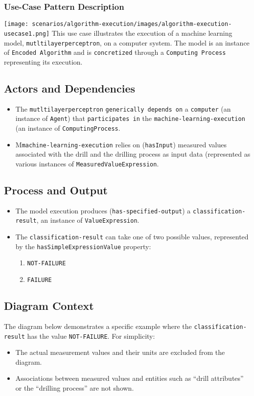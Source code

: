 \subsubsection*{Use-Case Pattern Description}

\texttt{[image: scenarios/algorithm-execution/images/algorithm-execution-usecase1.png]}
This use case illustrates the execution of a machine learning model, \texttt{mutltilayerperceptron}, on a computer system. The model is an instance of \texttt{Encoded Algorithm} and is \texttt{concretized} through a \texttt{Computing Process} representing its execution.

\subsection*{Actors and Dependencies}  
\begin{itemize}
    \item The \texttt{mutltilayerperceptron}  \texttt{generically depends on} a \texttt{computer} (an instance of \texttt{Agent}) that \texttt{participates in} the \texttt{machine-learning-execution} (an instance of \texttt{ComputingProcess}.
    \item M\texttt{machine-learning-execution} relies on (\texttt{hasInput}) measured values associated with the drill and the drilling process as input data (represented as various instances of \texttt{MeasuredValueExpression}.
\end{itemize}

\subsection*{Process and Output}  
\begin{itemize}
    \item The model execution produces (\texttt{has-specified-output}) a \texttt{classification-result}, an instance of \texttt{ValueExpression}.
    \item The \texttt{classification-result} can take one of two possible values, represented by the \texttt{hasSimpleExpressionValue} property:
    \begin{enumerate}
        \item \texttt{NOT-FAILURE}
        \item \texttt{FAILURE}
    \end{enumerate}
\end{itemize}

\subsection*{Diagram Context}  
The diagram below demonstrates a specific example where the \texttt{classification-result} has the value \texttt{NOT-FAILURE}. For simplicity:
\begin{itemize}
    \item The actual measurement values and their units are excluded from the diagram.
    \item Associations between measured values and entities such as “drill attributes” or the “drilling process” are not shown.
\end{itemize}


